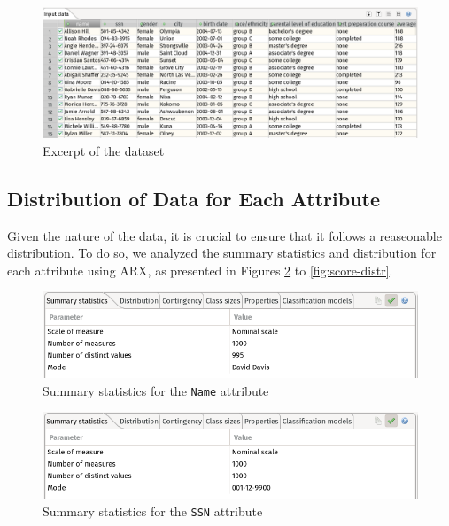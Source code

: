 \documentclass[a4paper, 11pt]{article}
\begin{document}
\begin{figure}[H]
    \centering
    \includegraphics[width=\textwidth]{img/input-data.png}
    \caption{Excerpt of the dataset}
    \label{fig:input-data}
\end{figure}

\pagebreak

\subsection{Distribution of Data for Each Attribute}

Given the nature of the data, it is crucial to ensure that it follows a 
reaseonable distribution. To do so, we analyzed the summary statistics and 
distribution for each attribute using ARX, as presented in Figures 
\ref{fig:name-arx} to \ref{fig:score-distr}.\\

\begin{figure}[H]
    \centering
    \includegraphics[width=.9\textwidth]{img/name.png}
    \caption{Summary statistics for the \texttt{Name} attribute}
    \label{fig:name-arx}
\end{figure}

\vspace{2\baselineskip}

\begin{figure}[H]
    \centering
    \includegraphics[width=.9\textwidth]{img/ssn.png}
    \caption{Summary statistics for the \texttt{SSN} attribute}
\end{figure}
\end{document}

